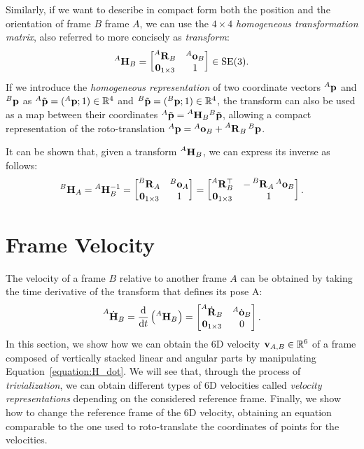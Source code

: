 Similarly, if we want to describe in compact form both the position and the orientation of frame $B$ \wrt frame $A$, we can use the $4 \times 4$ \emph{homogeneous transformation matrix}, also referred to more concisely as \emph{transform}:
%
\begin{equation*}
    \homo[A]_B = \begin{bmatrix} \rot[A]_B & \ori[A]_B \\ \zeros_{1 \times 3} & 1 \end{bmatrix} \in \SE(3)
    .
\end{equation*}
%
If we introduce the \emph{homogeneous representation} of two coordinate vectors $\pos[A]$ and $\pos[B]$ as ${}^A\Tilde{\mathbf{p}} = (\pos[A]; 1) \in \realn^4$ and ${}^B\Tilde{\mathbf{p}} = (\pos[B]; 1) \in \realn^4$, the transform can also be used as a map between their coordinates ${}^A\Tilde{\mathbf{p}} = \homo[A]_B {}^B\Tilde{\mathbf{p}}$, allowing a compact representation of the roto-translation $\pos[A] = \ori[A]_B + \rot[A]_B \pos[B]$.

It can be shown that, given a transform $\homo[A]_B$, we can express its inverse as follows:
%
\begin{equation}
    \label{eq:transform_inverse}
    \homo[B]_A = \homo[A]_B^{-1} =
    \begin{bmatrix}
        \rot[B]_A & \ori[B]_A \\
        \zeros_{1\times3} & 1
    \end{bmatrix} =
    \begin{bmatrix}
        \rot[A]_B^\top & -\rot[B]_A \ori[A]_B \\
        \zeros_{1\times3} & 1
    \end{bmatrix}
    .
\end{equation}

\section{Frame Velocity}
\label{sec:frame_velocities}

The velocity of a frame $B$ relative to another frame $A$ can be obtained by taking the time derivative of the transform that defines its pose \wrt A:
%
\begin{equation}
    \label{equation:H_dot}
    \homod[A]_B
    = \dv{}{t}\left(\homo[A]_B\right)
    =
    \begin{bmatrix}
        \rotd[A]_B & \orid[A]_B \\ \zeros_{1\times3} & 0
    \end{bmatrix}
    .
\end{equation}
%
In this section, we show how we can obtain the 6D velocity $\velsix_{A,B} \in \realn^6$ of a frame composed of vertically stacked linear and angular parts by manipulating Equation~\eqref{equation:H_dot}.
We will see that, through the process of \emph{trivialization}, we can obtain different types of 6D velocities called \emph{velocity representations} depending on the considered reference frame.
Finally, we show how to change the reference frame of the 6D velocity, obtaining an equation comparable to the one used to roto-translate the coordinates of points for the velocities.


